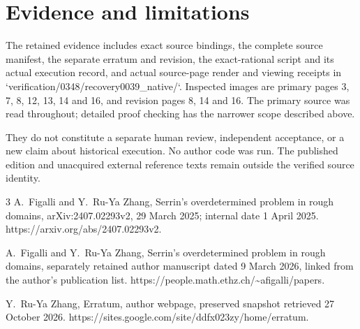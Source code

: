 \documentclass[10pt]{article}
\begin{document}
\section*{Evidence and limitations}
The retained evidence includes exact source bindings, the complete source manifest, the separate erratum and revision, the exact-rational script and its actual execution record, and actual source-page render and viewing receipts in `verification/0348/recovery0039\_native/`. Inspected images are primary pages 3, 7, 8, 12, 13, 14 and 16, and revision pages 8, 14 and 16. The primary source was read throughout; detailed proof checking has the narrower scope described above.\par
They do not constitute a separate human review, independent acceptance, or a new claim about historical execution. No author code was run. The published edition and unacquired external reference texts remain outside the verified source identity.\par
3 A. Figalli and Y. Ru-Ya Zhang, Serrin’s overdetermined problem in rough domains, arXiv:2407.02293v2, 29 March 2025; internal date 1 April 2025. https://arxiv.org/abs/2407.02293v2.\par
A. Figalli and Y. Ru-Ya Zhang, Serrin’s overdetermined problem in rough domains, separately retained author manuscript dated 9 March 2026, linked from the author’s publication list. https://people.math.ethz.ch/\textasciitilde{}afigalli/papers.\par
Y. Ru-Ya Zhang, Erratum, author webpage, preserved snapshot retrieved 27 October 2026. https://sites.google.com/site/ddfx023zy/home/erratum.\par
\end{document}
